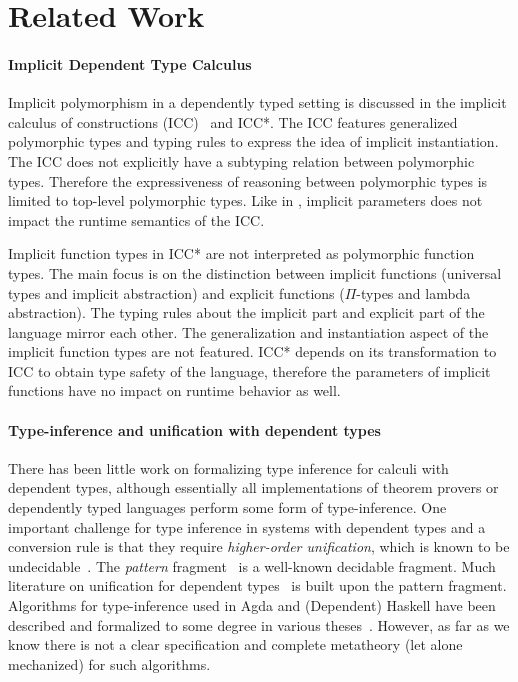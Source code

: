 \section{Related Work}

\paragraph{Implicit Dependent Type Calculus}
Implicit polymorphism in a dependently typed
setting is discussed in the implicit calculus of constructions (ICC)~\citep{miquel2001implicit} and
ICC*\citep{barras2008implicit}. The ICC features generalized polymorphic types and typing rules to express
the idea of implicit instantiation. The ICC does not explicitly have a subtyping
relation between polymorphic types. Therefore the expressiveness of reasoning
between polymorphic types is limited to top-level polymorphic types. Like
in \name, implicit parameters does not impact the runtime semantics of the ICC.

Implicit function types in ICC* are not interpreted as polymorphic
function types. The main focus is on the distinction between implicit
functions (universal types and implicit abstraction) and explicit functions
($\Pi$-types and lambda abstraction).
The typing rules about the implicit part and explicit part of the language mirror
each other. The generalization and instantiation aspect of the implicit function
types are not featured. ICC* depends on its transformation to ICC to obtain type safety
of the language, therefore the parameters of implicit functions have no impact
on runtime behavior as well.

\paragraph{Type-inference and unification with dependent types}
There has been little work on formalizing type inference for calculi
with dependent types, although essentially all implementations of
theorem provers or dependently typed languages perform some form of
type-inference.
One important challenge for type inference in
systems with dependent types and a conversion rule
is that they require \emph{higher-order unification},
which is known to be undecidable~\citep{goldfarb1981undecidability}. The \textit{pattern}
fragment~\citep{miller1991unification} is a well-known decidable
fragment. Much literature on unification for dependent
types~\citep{reed2009higher,abel2011higher, gundry2013tutorial, Cockx:2016:UEP:2951913.2951917, ziliani2015unification, coen2004mathematical} is
built upon the pattern fragment. Algorithms for type-inference used in Agda and
(Dependent) Haskell have been described and formalized to some degree
in various theses~\citep{norell,gundry,dh}. However, as far as we know
there is not a clear specification and complete metatheory (let alone
mechanized) for such algorithms.

